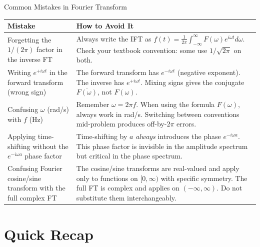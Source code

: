 \documentclass[12pt,a4paper]{article}
\begin{document}
\begin{mistakebox}{Common Mistakes in Fourier Transform}
\renewcommand{\arraystretch}{1.5}
\begin{tabular}{@{} p{5.5cm} p{8.0cm} @{}}
\toprule
\textbf{Mistake} & \textbf{How to Avoid It} \\
\midrule
Forgetting the $1/(2\pi)$ factor in the inverse FT &
  Always write the IFT as $f(t) = \frac{1}{2\pi}\int_{-\infty}^{\infty}F(\omega)e^{i\omega t}d\omega$.
  Check your textbook convention: some use $1/\sqrt{2\pi}$ on both. \\
Writing $e^{+i\omega t}$ in the forward transform (wrong sign) &
  The forward transform has $e^{-i\omega t}$ (negative exponent).
  The inverse has $e^{+i\omega t}$.
  Mixing signs gives the conjugate $\overline{F(\omega)}$, not $F(\omega)$. \\
Confusing $\omega$ (rad/s) with $f$ (Hz) &
  Remember $\omega = 2\pi f$.
  When using the formula $F(\omega)$, always work in rad/s.
  Switching between conventions mid-problem produces off-by-$2\pi$ errors. \\
Applying time-shifting without the $e^{-i\omega a}$ phase factor &
  Time-shifting by $a$ \emph{always} introduces the phase $e^{-i\omega a}$.
  This phase factor is invisible in the amplitude spectrum but critical in the phase spectrum. \\
Confusing Fourier cosine/sine transform with the full complex FT &
  The cosine/sine transforms are real-valued and apply only to functions on $[0,\infty)$ with specific symmetry.
  The full FT is complex and applies on $(-\infty,\infty)$.
  Do not substitute them interchangeably. \\
\bottomrule
\end{tabular}
\end{mistakebox}

\section{Quick Recap}
\end{document}
